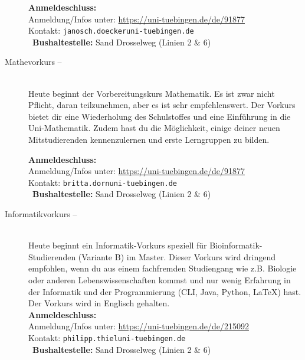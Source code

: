 \begin{description}
			\textbf{Anmeldeschluss:} \matheanmeldung\YEAR\\
			Anmeldung/Infos unter:  \url{https://uni-tuebingen.de/de/91877}\\
			Kontakt: \texttt{janosch.doecker\At uni-tuebingen.de}\\
			\ifsommersemester
			~\textbf{Bushaltestelle:} Sand Drosselweg (Linien 2 \& 6) 
			\fi
		\fi
	\fi
\fi

\ifbachelor
	\item[Mathevorkurs -- \mathedatum~\YEAR]~\\
	Heute beginnt der Vorbereitungskurs Mathematik. Es ist zwar nicht Pflicht, daran teilzunehmen, aber es ist sehr empfehlenswert.
	Der Vorkurs bietet dir eine Wiederholung des Schulstoffes und eine Einführung in die Uni-Mathematik. Zudem hast du die Möglichkeit, einige deiner neuen Mitstudierenden kennenzulernen und erste Lerngruppen zu bilden.

	\textbf{Anmeldeschluss:} \matheanmeldung\YEAR\\
	Anmeldung/Infos unter:  \url{https://uni-tuebingen.de/de/91877}\\
	Kontakt: \texttt{britta.dorn\At uni-tuebingen.de}\\
	\ifsommersemester
	~\textbf{Bushaltestelle:} Sand Drosselweg (Linien 2 \& 6) 
	\fi
\fi

\ifmaster
    \ifbinfo
        \item[Informatikvorkurs -- \bioinfoDatum~\YEAR]\ \\
            Heute beginnt ein Informatik-Vorkurs speziell für Bioinformatik-Studierenden (Variante B) im Master. Dieser Vorkurs wird dringend empfohlen, wenn du aus einem fachfremden Studiengang wie z.B. Biologie oder anderen Lebenswissenschaften kommst und nur wenig Erfahrung in der Informatik und der Programmierung (CLI, Java, Python, \LaTeX) hast. Der Vorkurs wird in Englisch gehalten. \\
            \textbf{Anmeldeschluss:} \bioinfoAnmeldung\YEAR\\
            Anmeldung/Infos unter: \url{https://uni-tuebingen.de/de/215092}\\
            Kontakt: \texttt{philipp.thiel\At uni-tuebingen.de}\\
        ~\textbf{Bushaltestelle:} Sand Drosselweg (Linien 2 \& 6)
    \fi
\fi



\end{description}
